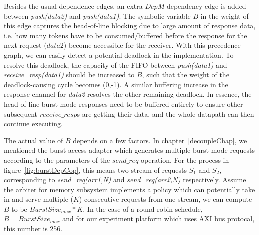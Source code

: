 Besides the usual dependence edges, an extra $DepM$ dependency edge is added between \textit{push(data2)}
and \textit{push(data1)}.
The symbolic variable $B$ in the weight of this edge captures the head-of-line blocking due to large amount of response data, i.e. how many tokens have to be consumed/buffered before the response for the next request ($data2$) become accessible for the receiver. 
With this precedence graph, we can easily detect a potential deadlock in the implementation. 
To resolve this deadlock, the capacity of the FIFO between \textit{push(data1)} and \textit{receive\_resp(data1)} should be increased to $B$, such
that the weight of the deadlock-causing cycle becomes (0,-1). A similar buffering increase in the response channel for \textit{data2} resolves the other remaining deadlock.
In essence, the head-of-line 
burst mode responses need to be buffered entirely to ensure other subsequent 
$receive\_resp$s are getting their data, and the whole datapath can then continue executing.

The actual value of $B$ depends on a few factors. In chapter~\ref{decoupleChap}, we mentioned the burst access adapter which generates
multiple burst mode requests according to the parameters of the $send\_req$ operation. For the
process in figure~\ref{fig:burstDepCop}, this means two stream of requests $S_1$ and $S_2$, corresponding to \textit{send\_req(arr1,N)} and \textit{send\_req(arr2,N)}  respectively.
Assume the arbiter for memory subsystem implements a policy which can potentially take in and serve multiple ($K$) consecutive requests from one stream, we can compute $B$ to be $BurstSize_{max}*K$. 
In the case of a round-robin schedule, $B = BurstSize_{max}$ and for our experiment platform which uses AXI bus protocal, this number is 256. 


